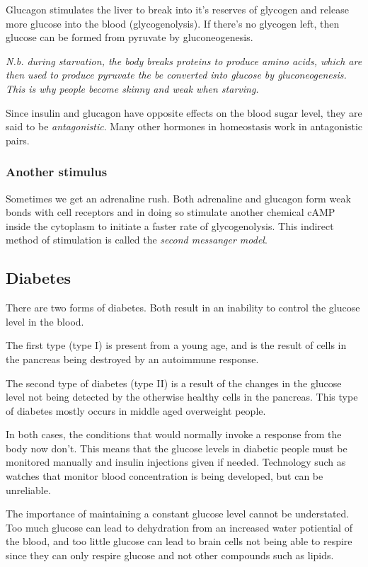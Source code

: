 \documentclass{article}
\begin{document}
Glucagon stimulates the liver to break into it's reserves of glycogen and
release more glucose into the blood (glycogenolysis). If there's no glycogen
left, then glucose can be formed from pyruvate by gluconeogenesis.

{\it N.b. during starvation, the body breaks proteins to produce amino acids,
which are then used to produce pyruvate the be converted into glucose by
gluconeogenesis. This is why people become skinny and weak when starving.}

Since insulin and glucagon have opposite effects on the blood sugar level, they
are said to be {\it antagonistic}. Many other hormones in homeostasis work in
antagonistic pairs.

\subsubsection*{Another stimulus}

Sometimes we get an adrenaline rush. Both adrenaline and glucagon form weak
bonds with cell receptors and in doing so stimulate another chemical cAMP inside
the cytoplasm to initiate a faster rate of glycogenolysis. This indirect method
of stimulation is called the {\it second messanger model}.

\subsection*{Diabetes}

There are two forms of diabetes. Both result in an inability to control the
glucose level in the blood.

The first type (type I) is present from a young age, and is the result of cells
in the pancreas being destroyed by an autoimmune response.

The second type of diabetes (type II) is a result of the changes in the glucose
level not being detected by the otherwise healthy cells in the pancreas. This
type of diabetes mostly occurs in middle aged overweight people.

In both cases, the conditions that would normally invoke a response from the
body now don't. This means that the glucose levels in diabetic people must be
monitored manually and insulin injections given if needed. Technology such as
watches that monitor blood concentration is being developed, but can be
unreliable.

The importance of maintaining a constant glucose level cannot be understated.
Too much glucose can lead to dehydration from an increased water potiential of
the blood, and too little glucose can lead to brain cells not being able to
respire since they can only respire glucose and not other compounds such as
lipids.
\end{document}
